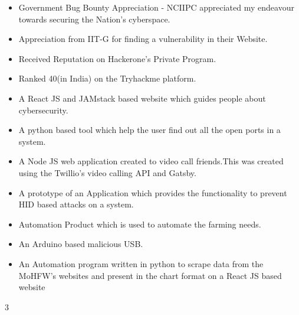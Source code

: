 
\begin{itemize}
\item Government Bug Bounty Appreciation - NCIIPC appreciated my endeavour towards securing the Nation's cyberspace.
\item Appreciation from IIT-G for finding a vulnerability in their Website.
\item Received Reputation on Hackerone's Private Program.
\item Ranked 40(in India) on the Tryhackme platform.
\end{itemize}

\begin{itemize}
\item A React JS and JAMstack based website which guides people about cybersecurity. 
\end{itemize}

\begin{itemize}
\item A python based tool which help the user find out all the open ports in a system.
\end{itemize}

\begin{itemize}
\item A Node JS web application created to video call friends.This was created using the Twillio's video calling  API and Gatsby.  
\end{itemize}

\begin{itemize}
\item A prototype of an Application which provides the functionality to prevent HID based attacks on a system.
\end{itemize}

\begin{itemize}
\item Automation Product which is used to automate the farming needs.
\end{itemize}

\begin{itemize}
\item An Arduino based malicious USB.  
\end{itemize}

\begin{itemize}
\item An Automation program written in python to scrape data from the MoHFW's websites and present in the chart format on a React JS based website
\end{itemize}
 {3}

